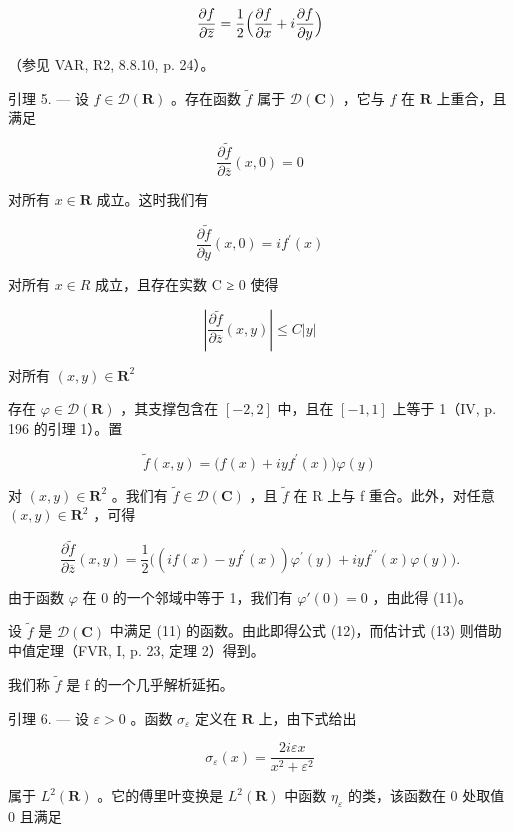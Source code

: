 \[
{\frac {\partial f}{\partial \overline {{{z}}}}} = {\frac {1}{2}} {\Bigl (} {\frac {\partial f}{\partial x}} + i {\frac {\partial f}{\partial y}} {\Bigr)}
\]

（参见 VAR, R2, 8.8.10, p. 24）。

引理 5. --- 设 \(f \in \mathcal{D}(\mathbf{R})\) 。存在函数 \(\tilde{f}\) 属于 \(\mathcal{D}(\mathbf{C})\) ，它与 \(f\) 在 \(\mathbf{R}\) 上重合，且满足

\[
\frac {\partial \widetilde {f}}{\partial \overline {{z}}} (x, 0) = 0\tag{11}
\]

对所有 \(x \in \mathbf{R}\) 成立。这时我们有

\[
\frac {\partial \widetilde {f}}{\partial y} (x, 0) = i f ^ {\prime} (x)\tag{12}
\]

对所有 \(x \in R\) 成立，且存在实数 C ≥ 0 使得

\[
\left| \frac {\partial \widetilde {f}}{\partial \overline {{z}}} (x, y) \right| \leqslant C | y |\tag{13}
\]

对所有 \((x,y)\in \mathbf{R}^2\)

存在 \(\varphi\in\mathcal{D}(\mathbf{R})\) ，其支撑包含在 \([-2,2]\) 中，且在 \([-1,1]\) 上等于 1（IV, p. 196 的引理 1）。置

\[
\widetilde {f} (x, y) = \bigl (f (x) + i y f ^ {\prime} (x) \bigr) \varphi (y)
\]

对 \((x,y)\in\mathbf{R}^{2}\) 。我们有 \(\widetilde{f}\in\mathcal{D}(\mathbf{C})\) ，且 \(\widetilde{f}\) 在 R 上与 f 重合。此外，对任意 \((x,y)\in\mathbf{R}^{2}\) ，可得

\[
\frac {\partial \widetilde {f}}{\partial \overline {{z}}} (x, y) = \frac {1}{2} \Big ((i f (x) - y f ^ {\prime} (x)) \varphi^ {\prime} (y) + i y f ^ {\prime \prime} (x) \varphi (y) \Big).
\]

由于函数 \(\varphi\) 在 0 的一个邻域中等于 1，我们有 \(\varphi'(0) = 0\) ，由此得 (11)。

设 \(\tilde{f}\) 是 \(\mathcal{D}(\mathbf{C})\) 中满足 (11) 的函数。由此即得公式 (12)，而估计式 (13) 则借助中值定理（FVR, I, p. 23, 定理 2）得到。

我们称 \(\tilde{f}\) 是 f 的一个几乎解析延拓。

引理 6. --- 设 \(\varepsilon > 0\) 。函数 \(\sigma_{\varepsilon}\) 定义在 \(\mathbf{R}\) 上，由下式给出

\[
\sigma_ {\varepsilon} (x) = \frac {2 i \varepsilon x}{x ^ {2} + \varepsilon^ {2}}
\]

属于 \(L^{2}(\mathbf{R})\) 。它的傅里叶变换是 \(L^{2}(\mathbf{R})\) 中函数 \(\eta_{\varepsilon}\) 的类，该函数在 0 处取值 0 且满足

